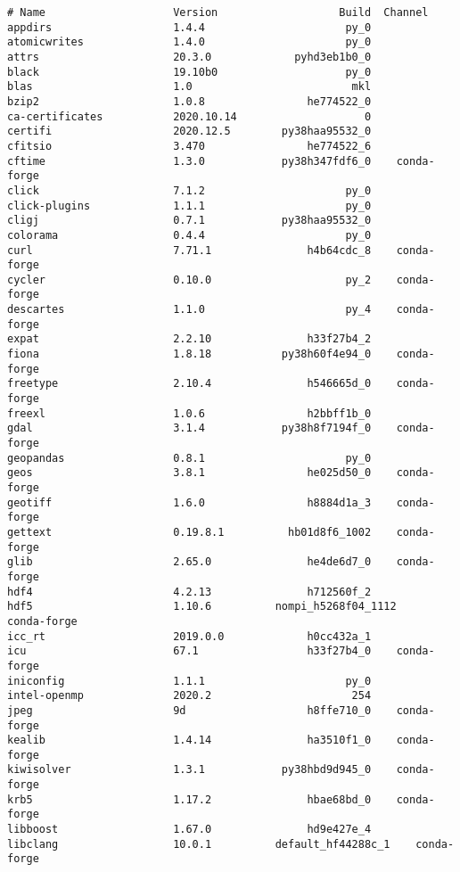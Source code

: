 \begin{Verbatim}
# Name                    Version                   Build  Channel
appdirs                   1.4.4                      py_0
atomicwrites              1.4.0                      py_0
attrs                     20.3.0             pyhd3eb1b0_0
black                     19.10b0                    py_0
blas                      1.0                         mkl
bzip2                     1.0.8                he774522_0
ca-certificates           2020.10.14                    0
certifi                   2020.12.5        py38haa95532_0
cfitsio                   3.470                he774522_6
cftime                    1.3.0            py38h347fdf6_0    conda-forge
click                     7.1.2                      py_0
click-plugins             1.1.1                      py_0
cligj                     0.7.1            py38haa95532_0
colorama                  0.4.4                      py_0
curl                      7.71.1               h4b64cdc_8    conda-forge
cycler                    0.10.0                     py_2    conda-forge
descartes                 1.1.0                      py_4    conda-forge
expat                     2.2.10               h33f27b4_2
fiona                     1.8.18           py38h60f4e94_0    conda-forge
freetype                  2.10.4               h546665d_0    conda-forge
freexl                    1.0.6                h2bbff1b_0
gdal                      3.1.4            py38h8f7194f_0    conda-forge
geopandas                 0.8.1                      py_0
geos                      3.8.1                he025d50_0    conda-forge
geotiff                   1.6.0                h8884d1a_3    conda-forge
gettext                   0.19.8.1          hb01d8f6_1002    conda-forge
glib                      2.65.0               he4de6d7_0    conda-forge
hdf4                      4.2.13               h712560f_2
hdf5                      1.10.6          nompi_h5268f04_1112    conda-forge
icc_rt                    2019.0.0             h0cc432a_1
icu                       67.1                 h33f27b4_0    conda-forge
iniconfig                 1.1.1                      py_0
intel-openmp              2020.2                      254
jpeg                      9d                   h8ffe710_0    conda-forge
kealib                    1.4.14               ha3510f1_0    conda-forge
kiwisolver                1.3.1            py38hbd9d945_0    conda-forge
krb5                      1.17.2               hbae68bd_0    conda-forge
libboost                  1.67.0               hd9e427e_4
libclang                  10.0.1          default_hf44288c_1    conda-forge

\end{Verbatim}
